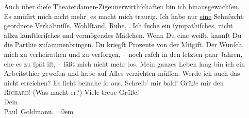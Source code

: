 \begin{ledgroupsized}[t]{13cm}
           Auch über dieſe Theaterdamen-Zigeunerwirthſchaften bin ich hinausgewachſen. Es
               amüſirt mich nicht mehr\textcolor{gray}{,} es macht mich \strikeout{\textcolor{gray}{trau}} traurig. {\pb}Ich habe nur \uline{eine} Sehnſucht: geordnete Verhältniſſe, Wohlſtand, Ruhe, \label{K_L02903-4v}\label{K_L02903-4h}. Ich ſuche ein
               ſympathiſches, nicht allzu künſtleriſches und vermögendes Mädchen. Wenn Du eine
               weißt, kannſt Du die Parthie zuſammenbringen. Du kriegſt Prozente von der
               Mitgift.\pend
           \pstart
           Der Wunſch, mich zu verheirathen und zu verſorgen, – noch raſch in den letzten paar
               Jahren, ehe es zu ſpät iſt, – läßt mich nicht mehr los. Mein ganzes Leben lang bin
               ich ein Arbeitsthier geweſen und habe auf Alles verzichten müſſen. Werde ich auch das
               nicht erreichen? Es ſieht {\pb}beinahe ſo aus.\pend
           \pstart
           Schreib’ mir bald!\pend
           \pstart
           Grüße mir den \textsc{Richard}! (Was macht er?)\pend
           \pstart
           Viele treue Grüße! {\\[\baselineskip]}Dein {\\[\baselineskip]}\spacefill\mbox{Paul Goldmann.}\pend
           \leftskip=0em{}
         
         \endnumbering{}\end{ledgroupsized}  \newcommand{\dateiname}{L02903}\newcommand{\titel}{Paul Goldmann an Arthur Schnitzler, 23. 1. [1900]}\newcommand{\editorInnen}{Martin Anton Müller und Laura Untner}
      